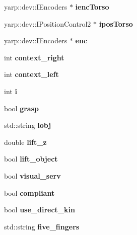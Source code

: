 \begin{DoxyCompactItemize}
\item 
yarp\+::dev\+::\+I\+Encoders $\ast$ {\bfseries ienc\+Torso}\label{classGraspExecution_a37f02113f5df20eaf639d3de5f50201a}

\item 
yarp\+::dev\+::\+I\+Position\+Control2 $\ast$ {\bfseries ipos\+Torso}\label{classGraspExecution_acd38eb6d7a7a592af60f056fc3558e8b}

\item 
yarp\+::dev\+::\+I\+Encoders $\ast$ {\bfseries enc}\label{classGraspExecution_a19645dbad457efb2f59659cd9d7716e1}

\item 
int {\bfseries context\+\_\+right}\label{classGraspExecution_a0617f4bf93413fd67d7ea0d86dc9898c}

\item 
int {\bfseries context\+\_\+left}\label{classGraspExecution_a5f50814446b2f0d15f7aa0b3cb036d3f}

\item 
int {\bfseries i}\label{classGraspExecution_a344f407ea6a058eacfb4e2d90eb51735}

\item 
bool {\bfseries grasp}\label{classGraspExecution_a611a58c5c2d2d7c32650bea057b35b5b}

\item 
std\+::string {\bfseries lobj}\label{classGraspExecution_a79b348f9568652db2921d279abcc1bcb}

\item 
double {\bfseries lift\+\_\+z}\label{classGraspExecution_a7c860cfc650285d57e86fd51ecbf30c1}

\item 
bool {\bfseries lift\+\_\+object}\label{classGraspExecution_a4d42020c419b390a9a336d91c0a1c3ae}

\item 
bool {\bfseries visual\+\_\+serv}\label{classGraspExecution_a3e8755ff9c95ee15784a7d46f74489fd}

\item 
bool {\bfseries compliant}\label{classGraspExecution_ad3dc733ddabb20c1d53a195fcad3af3a}

\item 
bool {\bfseries use\+\_\+direct\+\_\+kin}\label{classGraspExecution_a87216175d159e749932552f999ec7267}

\item 
std\+::string {\bfseries five\+\_\+fingers}\label{classGraspExecution_a01cec6b4c21531dbc733488924d80ca8}


\end{DoxyCompactItemize}
